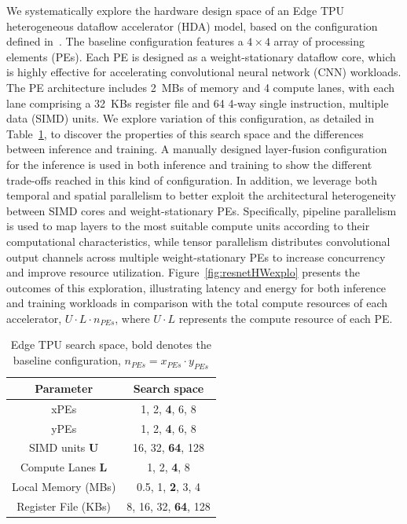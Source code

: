 \documentclass[lettersize,journal]{IEEEtran}
\begin{document}

We systematically explore the hardware design space of an Edge TPU heterogeneous dataflow accelerator (HDA) model, based on the configuration defined in~\cite{Zhou2022CoDesignTPU}. The baseline configuration features a $4 \times 4$ array of processing elements (PEs). Each PE is designed as a weight-stationary dataflow core, which is highly effective for accelerating convolutional neural network (CNN) workloads. The PE architecture includes 2~MBs of memory and 4 compute lanes, with each lane comprising a 32~KBs register file and 64 4-way single instruction, multiple data (SIMD) units. We explore variation of this configuration, as detailed in Table~\ref{tab:tpusearchspace}, to discover the properties of this search space and the differences between inference and training. A manually designed layer-fusion configuration for the inference is used in both inference and training to show the different trade-offs reached in this kind of configuration. 
In addition, we leverage both temporal and spatial parallelism to better exploit the architectural heterogeneity between SIMD cores and weight-stationary PEs. Specifically, pipeline parallelism is used to map layers to the most suitable compute units according to their computational characteristics, while tensor parallelism distributes convolutional output channels across multiple weight-stationary PEs to increase concurrency and improve resource utilization.
Figure~\ref{fig:resnetHWexplo} presents the outcomes of this exploration, illustrating latency and energy for both inference and training workloads in comparison with the total compute resources of each accelerator, $U \cdot L \cdot n_{PEs}$, where $U \cdot L$ represents the compute resource of each PE.

\begin{table}[b!]
    \centering
    \caption{Edge TPU search space, bold denotes the baseline configuration, $n_{PEs}=x_{PEs} \cdot y_{PEs}$}
    \begin{tabular}{c c}
         Parameter&  Search space\\ \hline
         xPEs & 1, 2, \textbf{4}, 6, 8 \\ \hline
         yPEs & 1, 2, \textbf{4}, 6, 8 \\ \hline
         SIMD units \textbf{U} & 16, 32, \textbf{64}, 128\\ \hline
         Compute Lanes \textbf{L}& 1, 2, \textbf{4}, 8\\ \hline
         Local Memory (MBs) & 0.5, 1, \textbf{2}, 3, 4\\ \hline
         Register File (KBs) & 8, 16, 32, \textbf{64}, 128\\ \hline
    \end{tabular}
    \label{tab:tpusearchspace}
\end{table}
\end{document}
